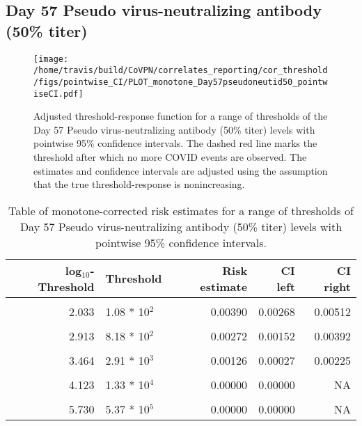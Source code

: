 \documentclass[]{book}
\theoremstyle{definition}
\theoremstyle{definition}
\theoremstyle{definition}
\newcommand{\1}{\mathbbm{1}}
\begin{document}
\newpage

\newpage

\newpage

\hypertarget{day-57-pseudo-virus-neutralizing-antibody-50-titer-1}{%
\subsection{Day 57 Pseudo virus-neutralizing antibody (50\% titer)}\label{day-57-pseudo-virus-neutralizing-antibody-50-titer-1}}

\begin{figure}[H]
\centering
\texttt{[image: /home/travis/build/CoVPN/correlates\_reporting/cor\_threshold/figs/pointwise\_CI/PLOT\_monotone\_Day57pseudoneutid50\_pointwiseCI.pdf]}
\caption{Adjusted threshold-response function for a range of thresholds of the
  Day 57 Pseudo virus-neutralizing antibody (50\% titer) levels with pointwise 95\% confidence intervals. The dashed red line marks the threshold after which no more COVID events are observed. The estimates and confidence intervals are adjusted using the assumption that the true threshold-response is nonincreasing.}
\end{figure}
\begin{table}[!h]

\caption{\label{tab:unnamed-chunk-367}Table of monotone-corrected risk estimates for a range of thresholds of Day 57 Pseudo virus-neutralizing antibody (50\% titer) levels with pointwise 95\% confidence intervals.}
\centering
\begin{tabular}[t]{rlrrr}
\toprule
log$_{10}$-Threshold & Threshold & Risk estimate & CI left & CI right\\
\midrule
\cellcolor{gray!6}{0.699} & \cellcolor{gray!6}{5.00 * 10$^0$} & \cellcolor{gray!6}{0.00508} & \cellcolor{gray!6}{0.00376} & \cellcolor{gray!6}{0.00639}\\
2.033 & 1.08 * 10$^2$ & 0.00390 & 0.00268 & 0.00512\\
\cellcolor{gray!6}{2.447} & \cellcolor{gray!6}{2.80 * 10$^2$} & \cellcolor{gray!6}{0.00347} & \cellcolor{gray!6}{0.00223} & \cellcolor{gray!6}{0.00471}\\
2.913 & 8.18 * 10$^2$ & 0.00272 & 0.00152 & 0.00392\\
\cellcolor{gray!6}{3.196} & \cellcolor{gray!6}{1.57 * 10$^3$} & \cellcolor{gray!6}{0.00235} & \cellcolor{gray!6}{0.00112} & \cellcolor{gray!6}{0.00358}\\
3.464 & 2.91 * 10$^3$ & 0.00126 & 0.00027 & 0.00225\\
\cellcolor{gray!6}{3.736} & \cellcolor{gray!6}{5.45 * 10$^3$} & \cellcolor{gray!6}{0.00126} & \cellcolor{gray!6}{0.00005} & \cellcolor{gray!6}{0.00247}\\
4.123 & 1.33 * 10$^4$ & 0.00000 & 0.00000 & NA\\
\cellcolor{gray!6}{4.629} & \cellcolor{gray!6}{4.26 * 10$^4$} & \cellcolor{gray!6}{0.00000} & \cellcolor{gray!6}{0.00000} & \cellcolor{gray!6}{NA}\\
5.730 & 5.37 * 10$^5$ & 0.00000 & 0.00000 & NA\\
\bottomrule
\end{tabular}
\end{table}
\end{document}

